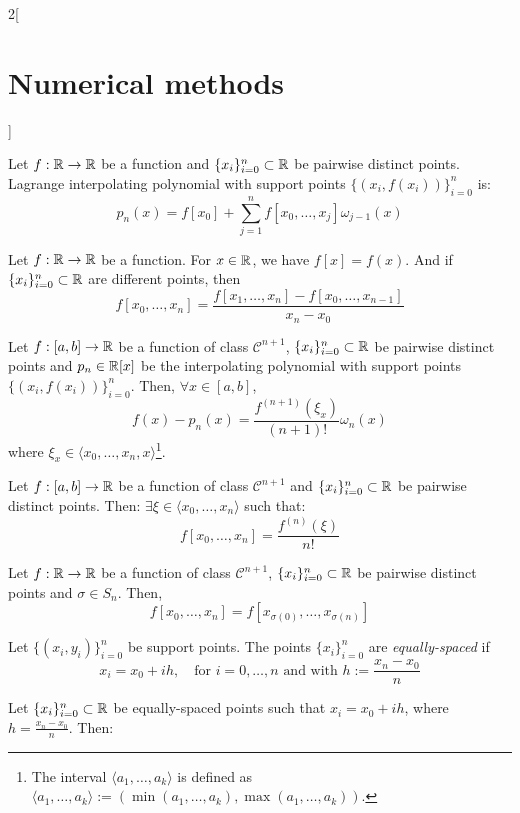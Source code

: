 \documentclass[../../../main.tex]{subfiles}
\begin{document}
\begin{multicols}{2}[\section{Numerical methods}]
\begin{definition}
  \end{definition}
  \begin{prop}
    Let $f:\mathbb{R}\rightarrow\mathbb{R}$ be a function and $\{x_i\}_{i=0}^n\subset\mathbb{R}$ be pairwise distinct points. Lagrange interpolating polynomial with support points $\{(x_i,f(x_i))\}_{i=0}^n$ is: $$p_n(x)=f[x_0]+\sum_{j=1}^nf[x_0,\ldots,x_j]\omega_{j-1}(x)$$
  \end{prop}
  \begin{method}
    Let $f:\mathbb{R}\rightarrow\mathbb{R}$ be a function. For $x\in\mathbb{R}$, we have $f[x]=f(x)$. And if $\{x_i\}_{i=0}^n\subset\mathbb{R}$ are different points, then $$f[x_0,\ldots,x_n]=\frac{f[x_1,\ldots,x_n]-f[x_0,\ldots,x_{n-1}]}{x_n-x_0}$$
  \end{method}
  \begin{theorem}
    Let $f:[a,b]\rightarrow\mathbb{R}$ be a function of class $\mathcal{C}^{n+1}$, $\{x_i\}_{i=0}^n\subset\mathbb{R}$ be pairwise distinct points and $p_n\in\mathbb{R}[x]$ be the interpolating polynomial with support points $\{(x_i,f(x_i))\}_{i=0}^n$. Then, $\forall x\in[a,b]$, $$f(x)-p_n(x)=\frac{f^{(n+1)}(\xi_x)}{(n+1)!}\omega_n(x)$$ where $\xi_x\in\langle x_0,\ldots,x_n,x\rangle$\footnote{The interval $\langle a_1,\ldots,a_k\rangle$ is defined as $\langle a_1,\ldots,a_k\rangle:=(\min(a_1,\ldots,a_k),\max(a_1,\ldots,a_k))$.}.
  \end{theorem}
  \begin{lemma}
    Let $f:[a,b]\rightarrow\mathbb{R}$ be a function of class $\mathcal{C}^{n+1}$ and $\{x_i\}_{i=0}^n\subset\mathbb{R}$ be pairwise distinct points. Then: $\exists\xi\in\langle x_0,\ldots,x_n\rangle$ such that: $$f[x_0,\ldots,x_n]=\frac{f^{(n)}(\xi)}{n!}$$
  \end{lemma}
  \begin{prop}
    Let $f:\mathbb{R}\rightarrow\mathbb{R}$ be a function of class $\mathcal{C}^{n+1}$, $\{x_i\}_{i=0}^n\subset\mathbb{R}$ be pairwise distinct points and $\sigma\in S_n$. Then, $$f[x_0,\ldots,x_n]=f[x_{\sigma(0)},\ldots,x_{\sigma(n)}]$$
  \end{prop}
  \begin{definition}
    Let $\{(x_i,y_i)\}_{i=0}^n$ be support points. The points $\{x_i\}_{i=0}^n$ are \textit{equally-spaced} if $$x_i=x_0+ih,\quad\text{for }i=0,\ldots,n\text{ and with }h:=\frac{x_n-x_0}{n}$$
  \end{definition}
  \begin{prop}
    Let $\{x_i\}_{i=0}^n\subset\mathbb{R}$ be equally-spaced points such that $x_i=x_0+ih$, where $h=\frac{x_n-x_0}{n}$. Then:

\end{prop}
\end{multicols}
\end{document}
